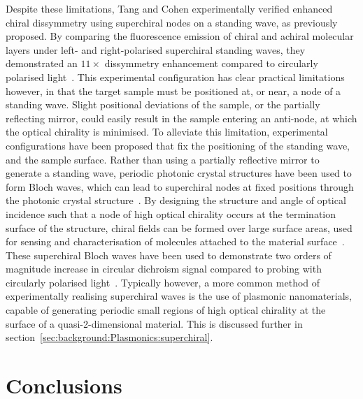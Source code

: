 Despite these limitations, Tang and Cohen experimentally verified enhanced chiral dissymmetry using superchiral nodes on a standing wave, as previously proposed. By comparing the fluorescence emission of chiral and achiral molecular layers under left- and right-polarised superchiral standing waves, they demonstrated an $11 \times$ dissymmetry enhancement compared to circularly polarised light~\cite{Tang2011}. This experimental configuration has clear practical limitations however, in that the target sample must be positioned at, or near, a node of a standing wave. Slight positional deviations of the sample, or the partially reflecting mirror, could easily result in the sample entering an anti-node, at which the optical chirality is minimised. To alleviate this limitation, experimental configurations have been proposed that fix the positioning of the standing wave, and the sample surface. Rather than using a partially reflective mirror to generate a standing wave, periodic photonic crystal structures have been used to form Bloch waves, which can lead to superchiral nodes at fixed positions through the photonic crystal structure~\cite{Sinibaldi2014, Pellegrini2017, Pellegrini2018}. By designing the structure and angle of optical incidence such that a node of high optical chirality occurs at the termination surface of the structure, chiral fields can be formed over large surface areas, used for sensing and characterisation of molecules attached to the material surface~\cite{Sinibaldi2014, Pellegrini2017}. These superchiral Bloch waves have been used to demonstrate two orders of magnitude increase in circular dichroism signal compared to probing with circularly polarised light~\cite{Pellegrini2017}.
Typically however, a more common method of experimentally realising superchiral waves is the use of plasmonic nanomaterials, capable of generating periodic small regions of high optical chirality at the surface of a quasi-2-dimensional material. This is discussed further in section~\ref{sec:background:Plasmonics:superchiral}.


\section{Conclusions}

